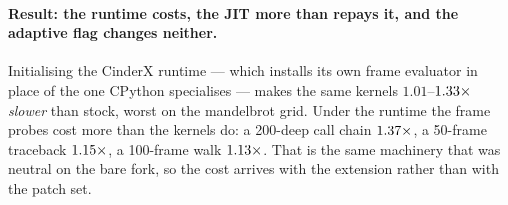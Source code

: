 \paragraph{Result: the runtime costs, the JIT more than repays it, and the adaptive flag
changes neither.} Initialising the CinderX runtime --- which installs its own frame evaluator
in place of the one CPython specialises --- makes the same kernels $1.01$--$\meas{ratio:b6_cinderx-fork_cinderx:mandelbrot/fork_cinderx|b6_cinderx-stock:mandelbrot/stock}{1.33}\times$
\emph{slower} than stock, worst on the mandelbrot grid. Under the runtime the frame probes cost
more than the kernels do: a 200-deep call chain $\meas{ratio:b6_cinderx-fork_cinderx:call_depth_200/fork_cinderx|b6_cinderx-stock:call_depth_200/stock}{1.37}\times$, a 50-frame traceback
$\meas{ratio:b6_cinderx-fork_cinderx:traceback_depth_50/fork_cinderx|b6_cinderx-stock:traceback_depth_50/stock}{1.15}\times$, a 100-frame walk $\meas{ratio:b6_cinderx-fork_cinderx:frame_walk_depth_100/fork_cinderx|b6_cinderx-stock:frame_walk_depth_100/stock}{1.13}\times$. That is the same machinery that was neutral on
the bare fork, so the cost arrives with the extension rather than with the patch set.

